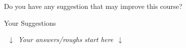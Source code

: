 Do you have any suggestion that may improve this course?

\begin{redbox}[height=3in]{Your Suggestions}
\end{redbox}

\dotfill~$\downarrow$~\textit{Your answers/roughs start here}~$\downarrow$~\dotfill
\fontsize{10}{12}\selectfont